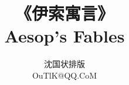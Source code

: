 \documentclass[a4paper, 12pt]{ctexart}
\title{《伊索寓言》\\Aesop's Fables}
\author{沈国状\quad 排版\\OuTlK@QQ.CoM}
\date{}
\begin{document}
    \maketitle
    \begin{multicols}{2}
        {
            \small
            \tableofcontents
        }
    \end{multicols}

    \newpage
    
\end{document}
